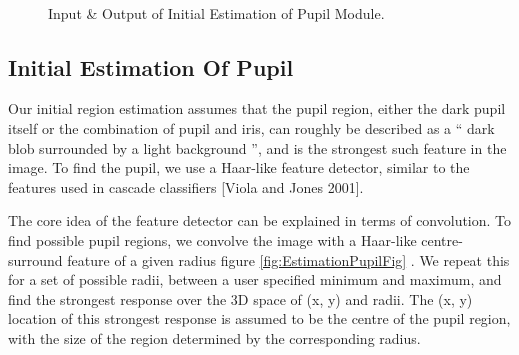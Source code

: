 \documentclass[12pt,fleqn]{book} %
\begin{document}
\begin{figure}[]
\begin{dBox}
\centering
  \mbox{
   }
   
   \caption{Input \& Output of Initial Estimation of Pupil Module. \label{fig:Initial_Estimation_Of_Pupil} }   
\end{dBox}   
\end{figure}

\subsection{Initial Estimation Of Pupil} 
Our initial region estimation assumes that the pupil region, either the dark pupil itself or the combination of pupil and iris, can roughly be described as a “ dark blob surrounded by a light background ”, and is the strongest such feature in the image. To find the pupil, we use a Haar-like feature detector, similar to the features used in cascade classifiers [Viola and Jones 2001]. \bigskip

The core idea of the feature detector can be explained in terms of convolution. To find possible pupil regions, we convolve the image with a Haar-like centre-surround feature of a given radius figure \ref{fig:EstimationPupilFig} . We repeat this for a set of possible radii, between a user specified minimum and maximum, and find the strongest response over the 3D space of (x, y) and radii. The (x, y) location of this strongest response is assumed to be the centre of the pupil region, with the size of the region determined by the corresponding radius. \bigskip
\end{document}
